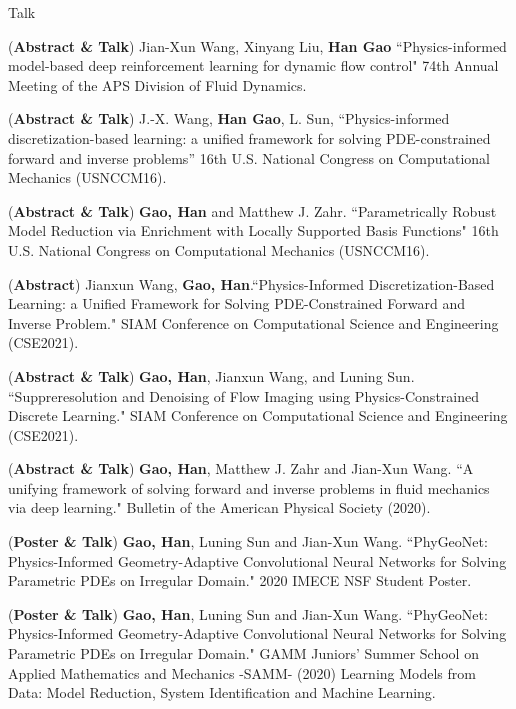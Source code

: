 \documentclass{resume} %
\begin{document}
\begin{rSection}{Talk}
\item (\textbf{\color{red}Abstract \& Talk}) Jian-Xun Wang, Xinyang Liu, \textbf{Han Gao} ``Physics-informed model-based deep reinforcement learning for dynamic flow control" 74th Annual Meeting of the APS Division of Fluid Dynamics. 

\item (\textbf{\color{red}Abstract \& Talk}) J.-X. Wang, \textbf{Han Gao}, L. Sun, ``Physics-informed discretization-based learning: a unified framework for solving PDE-constrained forward and inverse problems'' 16th U.S. National Congress on Computational Mechanics (USNCCM16).

\item (\textbf{\color{red}Abstract \& Talk}) \textbf{Gao, Han} and Matthew J. Zahr. ``Parametrically Robust Model Reduction via Enrichment with Locally Supported Basis Functions" 16th U.S. National Congress on Computational Mechanics (USNCCM16). 

\item (\textbf{\color{red}Abstract}) Jianxun Wang, \textbf{Gao, Han}.``Physics-Informed Discretization-Based Learning: a Unified Framework for Solving PDE-Constrained Forward and Inverse Problem." SIAM Conference on Computational Science and Engineering (CSE2021).

\item (\textbf{\color{red}Abstract \& Talk}) \textbf{Gao, Han}, Jianxun Wang, and Luning Sun. ``Suppreresolution and Denoising of Flow Imaging using Physics-Constrained Discrete Learning." SIAM Conference on Computational Science and Engineering (CSE2021).

\item (\textbf{\color{red}Abstract \& Talk}) \textbf{Gao, Han}, Matthew J. Zahr and Jian-Xun Wang. ``A unifying framework of solving forward and inverse problems in fluid mechanics via deep learning." Bulletin of the American Physical Society (2020).

\item (\textbf{\color{red}Poster \& Talk}) \textbf{Gao, Han}, Luning Sun and Jian-Xun Wang. ``PhyGeoNet: Physics-Informed Geometry-Adaptive Convolutional Neural Networks for Solving Parametric PDEs on Irregular Domain." 2020 IMECE NSF Student Poster.

\item (\textbf{\color{red}Poster \& Talk}) \textbf{Gao, Han}, Luning Sun and Jian-Xun Wang. ``PhyGeoNet: Physics-Informed Geometry-Adaptive Convolutional Neural Networks for Solving Parametric PDEs on Irregular Domain." GAMM Juniors’ Summer School on Applied Mathematics and Mechanics -SAMM- (2020) Learning Models from Data: Model Reduction, System Identification and Machine Learning.


\end{rSection}
\end{document}
